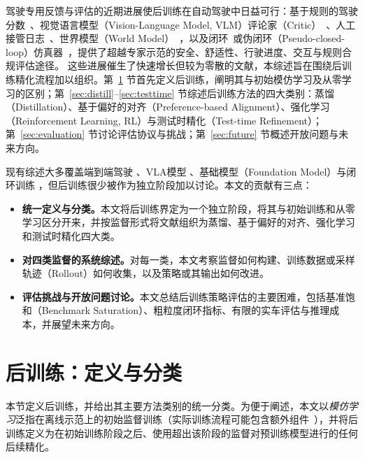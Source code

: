 \documentclass[runningheads]{llncs}
\begin{document}
驾驶专用反馈与评估的近期进展使后训练在自动驾驶中日益可行：基于规则的驾驶分数~\cite{navsim2024}、视觉语言模型（Vision-Language Model, VLM）评论家（Critic）~\cite{drivecritic2025}、人工接管日志~\cite{spanvla2026}、世界模型（World Model）~\cite{explorevla2026,dreamerad2026}，以及闭环~\cite{bench2drive2024,omnidreams2026}或伪闭环（Pseudo-closed-loop）仿真器~\cite{navsimv2_2025}，提供了超越专家示范的安全、舒适性、行驶进度、交互与规则合规评估途径。
这些进展催生了快速增长但较为零散的文献，本综述旨在围绕后训练精化流程加以组织。第~\ref{sec:pipeline} 节首先定义后训练，阐明其与初始模仿学习及从零学习的区别；第~\ref{sec:distill}--\ref{sec:testtime} 节综述后训练方法的四大类别：蒸馏（Distillation）、基于偏好的对齐（Preference-based Alignment）、强化学习（Reinforcement Learning, RL）与测试时精化（Test-time Refinement）；第~\ref{sec:evaluation} 节讨论评估协议与挑战；第~\ref{sec:future} 节概述开放问题与未来方向。



现有综述大多覆盖端到端驾驶 \cite{yang2025survey,xu2026survey}、VLA模型 \cite{hu2025vision,jiang2025survey}、基础模型（Foundation Model）\cite{gao2025survey}与闭环训练 \cite{karkus2025beyond}，但后训练很少被作为独立阶段加以讨论。本文的贡献有三点：




\begin{itemize}
\item \textbf{统一定义与分类。}本文将后训练界定为一个独立阶段，将其与初始训练和从零学习区分开来，并按监督形式将文献组织为蒸馏、基于偏好的对齐、强化学习和测试时精化四大类。
\item \textbf{对四类监督的系统综述。}对每一类，本文考察监督如何构建、训练数据或采样轨迹（Rollout）如何收集，以及策略或其输出如何改进。
\item \textbf{评估挑战与开放问题讨论。}本文总结后训练策略评估的主要困难，包括基准饱和（Benchmark Saturation）、粗粒度闭环指标、有限的实车评估与推理成本，并展望未来方向。
\end{itemize}





\section{后训练：定义与分类}
\label{sec:pipeline}
本节定义后训练，并给出其主要方法类别的统一分类。为便于阐述，本文以{\em 模仿学习}泛指在离线示范上的初始监督训练（实际训练流程可能包含额外组件~\cite{chitta2022transfuser,hu2023planning,jiang2023vad}），并将后训练定义为在初始训练阶段之后、使用超出该阶段的监督对预训练模型进行的任何后续精化。
\end{document}
